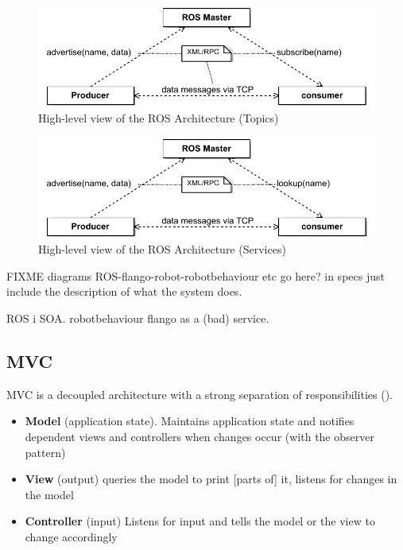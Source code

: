 \begin{figure}[htb]
    \centering
    \includegraphics{figures/design/ros-architecture-topics.pdf}
    \caption{High-level view of the ROS Architecture (Topics)}
    \label{fig:design-ros-topics}
\end{figure}

\begin{figure}[htb]
    \centering
    \includegraphics{figures/design/ros-architecture-services.pdf}
    \caption{High-level view of the ROS Architecture (Services)}
    \label{fig:design-ros-services}
\end{figure}

FIXME diagrams ROS-flango-robot-robotbehaviour etc go here? in specs  just include the description of what the system does.

ROS i SOA.
robotbehaviour
flango as a (bad) service.



\subsection{MVC}
\ac{MVC} is a decoupled architecture with a strong separation of responsibilities ().
\begin{itemize}
    \item \textbf{Model} (application state). Maintains application state and notifies dependent views and controllers when changes occur (with the observer pattern)
    \item \textbf{View} (output) queries the model to print [parts of] it, listens for changes in the model
    \item \textbf{Controller} (input) Listens for input and tells the model or the view to change accordingly
\end{itemize}

